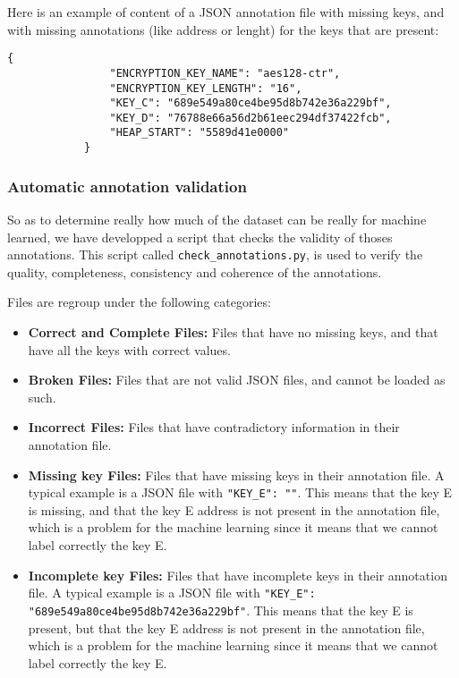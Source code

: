     \begin{minipage}{\dimexpr\linewidth-20pt}
        Here is an example of content of a JSON annotation file with missing keys, and with missing annotations (like address or lenght) for the keys that are present:

        \begin{lstlisting}[style=json, caption={Missing keys in JSON annotation file \textit{Training/basic/V\_6\_0\_P1/16/24375-1644243522.json}}]
            {
                "ENCRYPTION_KEY_NAME": "aes128-ctr",
                "ENCRYPTION_KEY_LENGTH": "16",
                "KEY_C": "689e549a80ce4be95d8b742e36a229bf",
                "KEY_D": "76788e66a56d2b61eec294df37422fcb",
                "HEAP_START": "5589d41e0000"
            }
        \end{lstlisting}
    \end{minipage}

    \subsubsection{Automatic annotation validation}
    So as to determine really how much of the dataset can be really for machine learned, we have developped a script that checks the validity of thoses annotations. This script called \texttt{check\_annotations.py}, is used to verify the quality, completeness, consistency and coherence of the annotations.

    Files are regroup under the following categories:

    \begin{itemize}
        \item \textbf{Correct and Complete Files:} Files that have no missing keys, and that have all the keys with correct values.
        \item \textbf{Broken Files:} Files that are not valid JSON files, and cannot be loaded as such.
        \item \textbf{Incorrect Files:} Files that have contradictory information in their annotation file.
        \item \textbf{Missing key Files:} Files that have missing keys in their annotation file. A typical example is a JSON file with \lstinline[style=json]!"KEY_E": ""!. This means that the key E is missing, and that the key E address is not present in the annotation file, which is a problem for the machine learning since it means that we cannot label correctly the key E.
        \item \textbf{Incomplete key Files:} Files that have incomplete keys in their annotation file. A typical example is a JSON file with \lstinline[style=json]!"KEY_E": "689e549a80ce4be95d8b742e36a229bf"!. This means that the key E is present, but that the key E address is not present in the annotation file, which is a problem for the machine learning since it means that we cannot label correctly the key E.
    \end{itemize}

